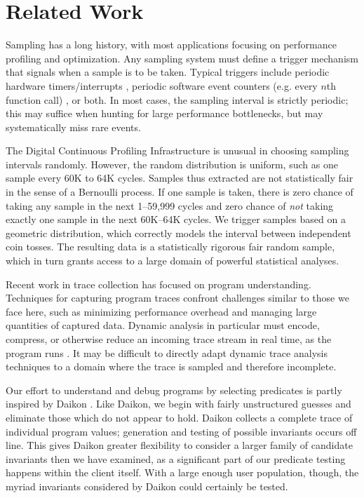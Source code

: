 \section{Related Work}
\label{sec:related-work}

Sampling has a long history, with most applications focusing on
performance profiling and optimization.  Any sampling system must
define a trigger mechanism that signals when a sample is to be taken.
Typical triggers include periodic hardware timers/interrupts
\cite{Burrows:2000:EFV,Traub:200:EILPP,Whaley:337483}, periodic
software event counters (e.g.  every $n$th function call)
\cite{Arnold:2000:ACCTS}, or both.  In most cases, the sampling
interval is strictly periodic; this may suffice when hunting for large
performance bottlenecks, but may systematically miss rare events.

The Digital Continuous Profiling Infrastructure
\cite{Anderson:1997:CPW} is unusual in choosing sampling intervals 
randomly.  However, the random distribution is uniform, such as one
sample every 60K to 64K cycles.  Samples thus extracted are not
statistically fair in the sense of a Bernoulli process.
If one sample is taken, there is zero chance of taking any sample in
the next 1--59,999 cycles and zero chance of
\emph{not} taking exactly one sample in the next 60K--64K cycles.  We
trigger samples based on a geometric distribution, which correctly
models the interval between independent coin tosses.  The resulting
data is a statistically rigorous fair random sample, which in turn
grants access to a large domain of powerful statistical analyses.

Recent work in trace collection has focused on program understanding.
Techniques for capturing program traces confront challenges similar to
those we face here, such as minimizing performance overhead and
managing large quantities of captured data.  Dynamic analysis in
particular must encode, compress, or otherwise reduce an incoming
trace stream in real time, as the program runs
\cite{Demsky:RBEOOP:2002,ICSE01*221}.  It may be difficult to directly
adapt dynamic trace analysis techniques to a domain where the trace is
sampled and therefore incomplete.  

Our effort to understand and debug programs by selecting predicates is
partly inspired by Daikon \cite{ernst2001}.  Like Daikon, we begin
with fairly unstructured guesses and eliminate those which do not
appear to hold.  Daikon collects a complete trace of individual
program values; generation and testing of possible invariants occurs
off line.  This gives Daikon greater flexibility to consider a
larger family of candidate invariants then we have examined, as a
significant part of our predicate testing happens within the client
itself.  With a large enough user population, though, the myriad
invariants considered by Daikon could certainly be tested.

